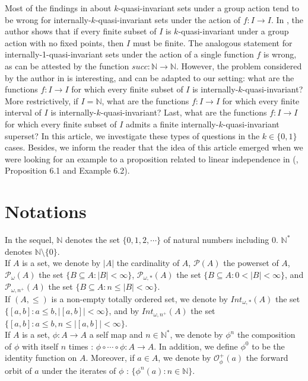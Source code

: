 \documentclass[a4paper,11pt]{article}
\theoremstyle{plain}
\theoremstyle{definition}
\theoremstyle{remark}
\begin{document}
Most of the findings in \cite{Brailovsky, Praeger, BrailovskyPasechenikPraeger, Kharazishvili, KimKim, AlaeiyanYoshiara, AlaeiyanRazzaghmanieshi} about $k$-quasi-invariant sets under a group action tend to be wrong for internally-$k$-quasi-invariant sets under the action of $f : I \to I$. In \cite{Praeger}, the author shows that if every finite subset of $I$ is $k$-quasi-invariant under a group action with no fixed points, then $I$ must be finite. The analogous statement for internally-1-quasi-invariant sets under the action of a single function $f$ is wrong, as can be attested by the function $succ : \mathbb{N} \to \mathbb{N}$. However, the problem considered by the author in \cite{Praeger} is interesting, and can be adapted to our setting: what are the functions $f : I \to I$ for which every finite subset of $I$ is internally-$k$-quasi-invariant? More restrictively, if $I = \mathbb{N}$, what are the functions $f : I \to I$ for which every finite interval of $I$ is internally-$k$-quasi-invariant? Last, what are the functions $f : I \to I$ for which every finite subset of $I$ admits a finite internally-$k$-quasi-invariant superset? In this article, we investigate these types of questions in the $k \in \{0,1\}$ cases. Besides, we inform the reader that the idea of this article emerged when we were looking for an example to a proposition related to linear independence in (\cite{ElIdrissiKabbaj}, Proposition 6.1 and Example 6.2).  

\section{Notations}
In the sequel, $\mathbb{N}$ denotes the set $\{0,1,2,\cdots\}$ of natural numbers including 0. $\mathbb{N}^*$ denotes $\mathbb{N} \setminus \{0\}$. \\
If $A$ is a set, we denote by $|A|$ the cardinality of $A$, $\mathcal{P}(A)$ the powerset of $A$, $\mathcal{P}_{\omega}(A)$ the set $\{B \subseteq A : |B| < \infty\}$, $\mathcal{P}_{\omega,*}(A)$ the set $\{B \subseteq A : 0 < |B| < \infty\}$, and $\mathcal{P}_{\omega,n^+}(A)$ the set $\{B \subseteq A : n \leq |B| < \infty\}$. \\
If $(A,\leq)$ is a non-empty totally ordered set, we denote by $Int_{\omega,*}(A)$ the set $\{ [a,b] : a \leq b, | [a,b] | < \infty\}$, and by $Int_{\omega, n^+}(A)$ the set $\{ [a,b] : a \leq b, n \leq | [a,b] | < \infty\}$. \\
If $A$ is a set, $\phi : A \to A$ a self map and $n \in \mathbb{N}^*$, we denote by $\phi^n$ the composition of $\phi$ with itself $n$ times : $\phi \circ \cdots \circ \phi : A \to A$. In addition, we define $\phi^0$ to be the identity function on $A$. Moreover, if $a \in A$, we denote by $\mathcal{O}^{+}_\phi(a)$ the forward orbit of $a$ under the iterates of $\phi$ : $\{\phi^n(a) : n \in \mathbb{N}\}$. 
\end{document}

